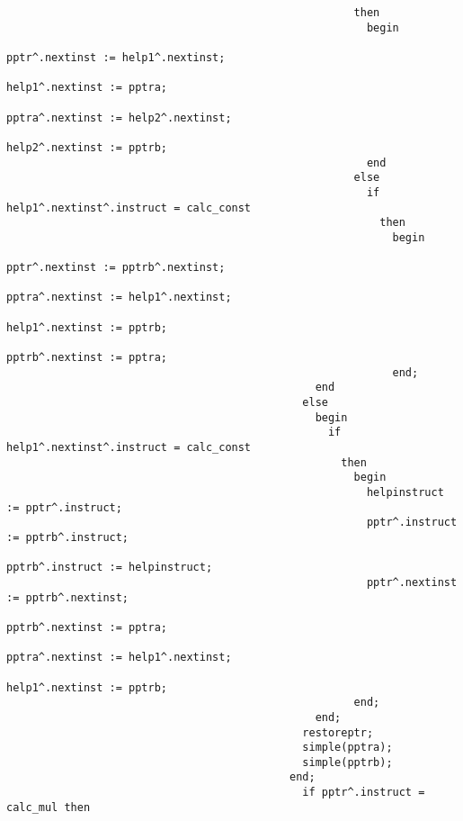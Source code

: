 \begin{refsection}
\begin{lstlisting}
                                                      then
                                                        begin
                                                          pptr^.nextinst := help1^.nextinst;
                                                          help1^.nextinst := pptra;
                                                          pptra^.nextinst := help2^.nextinst;
                                                          help2^.nextinst := pptrb;
                                                        end
                                                      else
                                                        if help1^.nextinst^.instruct = calc_const
                                                          then
                                                            begin
                                                              pptr^.nextinst := pptrb^.nextinst;
                                                              pptra^.nextinst := help1^.nextinst;
                                                              help1^.nextinst := pptrb;
                                                              pptrb^.nextinst := pptra;
                                                            end;
                                                end
                                              else
                                                begin
                                                  if help1^.nextinst^.instruct = calc_const
                                                    then
                                                      begin
                                                        helpinstruct := pptr^.instruct;
                                                        pptr^.instruct := pptrb^.instruct;
                                                        pptrb^.instruct := helpinstruct;
                                                        pptr^.nextinst := pptrb^.nextinst;
                                                        pptrb^.nextinst := pptra;
                                                        pptra^.nextinst := help1^.nextinst;
                                                        help1^.nextinst := pptrb;
                                                      end;
                                                end;
                                              restoreptr;
                                              simple(pptra);
                                              simple(pptrb);
                                            end;
                                              if pptr^.instruct = calc_mul then

\end{lstlisting}
\end{refsection}
